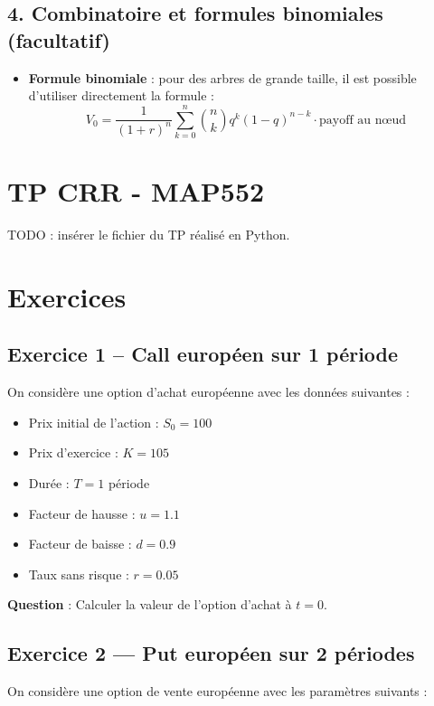 \documentclass[12pt,a4paper]{article}
\begin{document}
\subsection*{4. Combinatoire et formules binomiales (facultatif)}

\begin{itemize}
    \item \textbf{Formule binomiale} : pour des arbres de grande taille, il est possible d’utiliser directement la formule :
    \[
    V_0 = \frac{1}{(1 + r)^n} \sum_{k=0}^{n} \binom{n}{k} q^k (1-q)^{n-k} \cdot \text{payoff au nœud}
    \]
\end{itemize}

\section{TP CRR - MAP552}
TODO : insérer le fichier du TP réalisé en Python.

\section{Exercices}

\subsection*{Exercice 1 -- Call européen sur 1 période}
On considère une option d’achat européenne avec les données suivantes :

\begin{itemize}
    \item Prix initial de l’action : $S_0 = 100$
    \item Prix d’exercice : $K = 105$
    \item Durée : $T = 1$ période
    \item Facteur de hausse : $u = 1.1$
    \item Facteur de baisse : $d = 0.9$
    \item Taux sans risque : $r = 0.05$
\end{itemize}

\textbf{Question} : Calculer la valeur de l’option d’achat à $t = 0$.

\vspace{0.3cm}

\subsection*{Exercice 2 — Put européen sur 2 périodes}
On considère une option de vente européenne avec les paramètres suivants :
\end{document}
